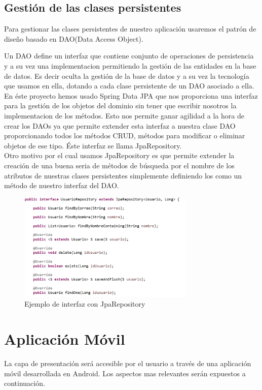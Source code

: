 \subsection{Gestión de las clases persistentes}
Para gestionar las clases persistentes de nuestro aplicación usaremos el patrón de diseño basado en DAO(Data Access Object).

 Un DAO define un interfaz que contiene conjunto de operaciones de persistencia y a su vez una implementacion permitiendo la gestión de las entidades en la base de datos. Es decir oculta la gestión de la base de datos y a su vez la tecnología que usamos en ella, dotando a cada clase persistente de un DAO asociado a ella. En éste proyecto hemos usado Spring Data JPA que nos proporciona una interfaz para la gestión de los objetos del dominio sin tener que escribir nosotros la implementacion de los métodos. Esto nos permite ganar agilidad a la hora de crear los DAOs ya que permite extender esta interfaz a nuestra clase DAO proporcionando todos los métodos CRUD, métodos para modificar o eliminar objetos de ese tipo. Éste interfaz se llama JpaRepository.\\


Otro motivo por el cual usamos JpaRepository es que permite extender la creación de una buena seria de métodos de búsqueda por el nombre de los atributos de nuestras clases persistentes simplemente definiendo los como un método de nuestro interfaz del DAO.
	\begin{figure}[H]
		\centering
		\includegraphics[width=0.75\textwidth] {jparepository.PNG}
		\caption{Ejemplo de interfaz con JpaRepository }
	\end{figure}
\section{Aplicación Móvil}
La capa de presentación será accesible por el usuario a través de una aplicación móvil desarrollada en Android. Los aspectos mas relevantes serán expuestos a continuación.

